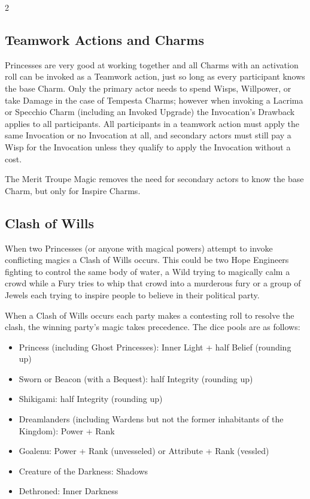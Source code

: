 \begin{multicols}{2}
\subsection*{Teamwork Actions and Charms}

Princesses are very good at working together and all Charms with an activation roll can be invoked as a Teamwork action, just so long as every participant knows the base Charm. Only the primary actor needs to spend Wisps, Willpower, or take Damage in the case of Tempesta Charms; however when invoking a Lacrima or Specchio Charm (including an Invoked Upgrade) the Invocation's Drawback applies to all participants. All participants in a teamwork action must apply the same Invocation or no Invocation at all, and secondary actors must still pay a Wisp for the Invocation unless they qualify to apply the Invocation without a cost. 

The Merit Troupe Magic removes the need for secondary actors to know the base Charm, but only for Inspire Charms. 

\subsection*{Clash of Wills}

When two Princesses (or anyone with magical powers) attempt to invoke conflicting magics a Clash of Wills occurs. This could be two Hope Engineers fighting to control the same body of water, a Wild trying to magically calm a crowd while a Fury tries to whip that crowd into a murderous fury or a group of Jewels each trying to inspire people to believe in their political party. 

When a Clash of Wills occurs each party makes a contesting roll to resolve the clash, the winning party's magic takes precedence. The dice pools are as follows: 
\begin{itemize} 
\item Princess (including Ghost Princesses): Inner Light + half Belief (rounding up)
\item Sworn or Beacon (with a Bequest): half Integrity (rounding up)
\item Shikigami: half Integrity (rounding up)
\item Dreamlanders (including Wardens but not the former inhabitants of the Kingdom): Power + Rank
\item Goalenu: Power + Rank (unvesseled) or Attribute + Rank (vessled)
\item Creature of the Darkness: Shadows
\item Dethroned: Inner Darkness
\end{itemize}


\end{multicols}
